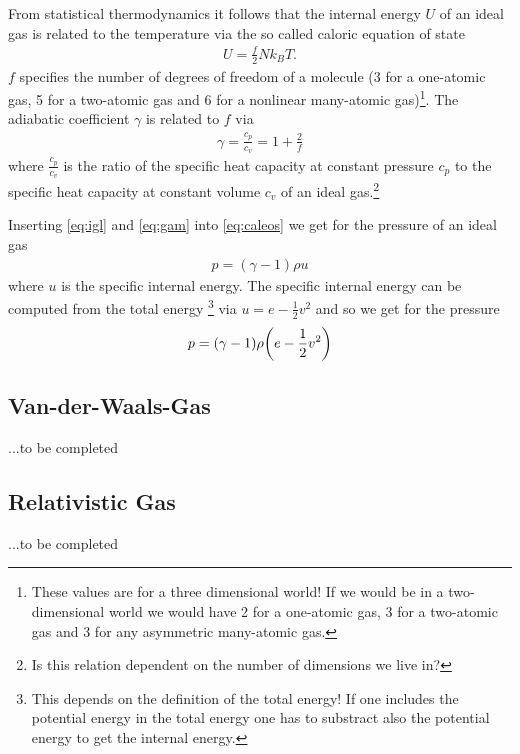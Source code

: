 From statistical thermodynamics it follows that the
internal energy $U$ of an ideal gas is related to the temperature via the
so called caloric equation of state
\begin{align}
U = \frac{f}{2}N k_B T. \label{eq:caleos}
\end{align}
$f$ specifies the number of degrees of freedom of a molecule (3 for a 
one-atomic gas, 5 for a two-atomic gas and 6 for a nonlinear many-atomic
gas)\footnote{These values are for a three dimensional world! If we would be
in a two-dimensional world we would have 2 for a 
one-atomic gas, 3 for a two-atomic gas and 3 for
any asymmetric many-atomic gas.}.
The adiabatic coefficient $\gamma$ is related to $f$ via
\begin{align}
\gamma = \frac{c_p}{c_v} = 1 + \frac{2}{f} \label{eq:gam}
\end{align}
where $\frac{c_p}{c_v}$ is the ratio of the specific
heat capacity at constant pressure $c_p$ to the specific heat capacity at
constant volume $c_v$ of an ideal gas.\footnote{Is this relation dependent on
the number of dimensions we live in?}

Inserting \eqref{eq:igl} and \eqref{eq:gam} into \eqref{eq:caleos} we get for
the pressure of an ideal gas
\begin{align}
p=(\gamma-1) \rho u \label{eq:igpress}
\end{align}
where $u$ is the specific internal energy. The specific internal energy can be
computed from the total energy \footnote{This depends
 on the definition of the total energy! If one includes the potential energy
in the total energy one has to substract also the potential energy to get the
internal energy.} via $u=e-\frac{1}{2}v^2$ and so we get for the
pressure
\begin{align}
p={ \left( \gamma-1 \right) } \rho { \left( e-\frac{1}{2}v^2 \right) }
\end{align}

\subsection{Van-der-Waals-Gas}

...to be completed

\subsection{Relativistic Gas}

...to be completed


